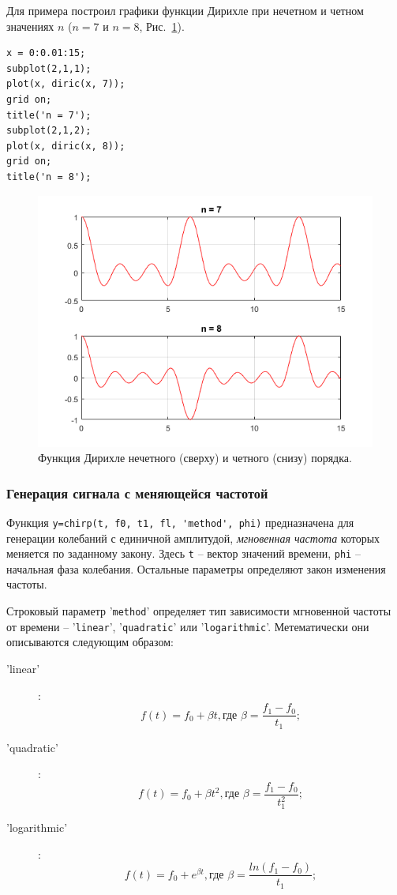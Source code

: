\documentclass[12pt,a4paper]{article}
\begin{document}
Для примера построил графики функции Дирихле при нечетном и четном значениях $n$ ($n=7$ и $n=8$, Рис.~\ref{fig:img_diric}).
\begin{verbatim}
x = 0:0.01:15;
subplot(2,1,1);
plot(x, diric(x, 7));
grid on;
title('n = 7');
subplot(2,1,2);
plot(x, diric(x, 8));
grid on;
title('n = 8');
\end{verbatim}
\begin{figure}[!ht]
  \centering
  \includegraphics[width=\linewidth]{img_diric}
  \caption{Функция Дирихле нечетного (сверху) и четного (снизу) порядка.}
  \label{fig:img_diric}
\end{figure}

\subsubsection{Генерация сигнала с меняющейся частотой}
Функция \verb|y=chirp(t, f0, t1, fl, 'method', phi)| предназначена для генерации колебаний с единичной амплитудой, \emph{мгновенная частота} которых меняется по заданному закону. Здесь \verb|t| -- вектор значений времени, \verb|phi| -- начальная фаза колебания. Остальные параметры определяют закон изменения частоты.

Строковый параметр '\verb|method|' определяет тип зависимости мгновенной частоты от времени -- '\verb|linear|', '\verb|quadratic|' или '\verb|logarithmic|'. Метематически они описываются следующим образом:
\begin{description}
	\item['linear']:
	{
		\begin{equation}
		f(t)=f_0+ \beta t, \textrm{где $\beta=\frac{f_1-f_0}{t_1}$};
		\end{equation}
	}
	
	\item['quadratic']:
	{
		\begin{equation}
		f(t)=f_0+ \beta t^2, \textrm{где $\beta=\frac{f_1-f_0}{t_1^2}$};
		\end{equation}
	}
	
	\item['logarithmic']:
	{
		\begin{equation}
		f(t)=f_0+ e^{\beta t}, \textrm{где $\beta=\frac{ln(f_1-f_0)}{t_1}$};
		\end{equation}
	}
\end{description}
\end{document}
